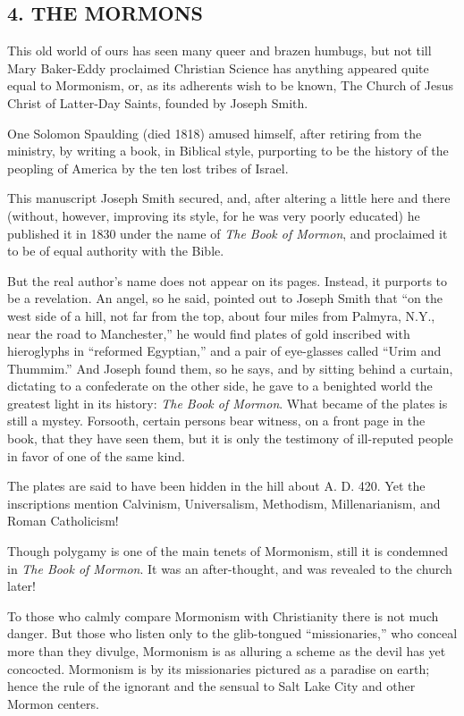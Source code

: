\documentclass[
]{book}
\begin{document}
\subsection*{\texorpdfstring{4. THE MORMONS}{4. THE MORMONS}}\label{the-mormons}

This old world of ours has seen many queer and brazen humbugs, but not till Mary Baker-Eddy proclaimed Christian Science has anything appeared quite equal to Mormonism, or, as its adherents wish to be known, The Church of Jesus Christ of Latter-Day Saints, founded by Joseph Smith.

One Solomon Spaulding (died 1818) amused himself, after retiring from the ministry, by writing a book, in Biblical style, purporting to be the history of the peopling of America by the ten lost tribes of Israel.

This manuscript Joseph Smith secured, and, after altering a little here and there (without, however, improving its style, for he was very poorly educated) he published it in 1830 under the name of \emph{The Book of Mormon}, and proclaimed it to be of equal authority with the Bible.

But the real author's name does not appear on its pages. Instead, it purports to be a revelation. An angel, so he said, pointed out to Joseph Smith that ``on the west side of a hill, not far from the top, about four miles from Palmyra, N.Y., near the road to Manchester,'' he would find plates of gold inscribed with hieroglyphs in ``reformed Egyptian,'' and a pair of eye-glasses called ``Urim and Thummim.'' And Joseph found them, so he says, and by sitting behind a curtain, dictating to a confederate on the other side, he gave to a benighted world the greatest light in its history: \emph{The Book of Mormon}. What became of the plates is still a mystey. Forsooth, certain persons bear witness, on a front page in the book, that they have seen them, but it is only the testimony of ill-reputed people in favor of one of the same kind.

The plates are said to have been hidden in the hill about A. D. 420. Yet the inscriptions mention Calvinism, Universalism, Methodism, Millenarianism, and Roman Catholicism!

Though polygamy is one of the main tenets of Mormonism, still it is condemned in \emph{The Book of Mormon}. It was an after-thought, and was revealed to the church later!

To those who calmly compare Mormonism with Christianity there is not much danger. But those who listen only to the glib-tongued ``missionaries,'' who conceal more than they divulge, Mormonism is as alluring a scheme as the devil has yet concocted. Mormonism is by its missionaries pictured as a paradise on earth; hence the rule of the ignorant and the sensual to Salt Lake City and other Mormon centers.
\end{document}
